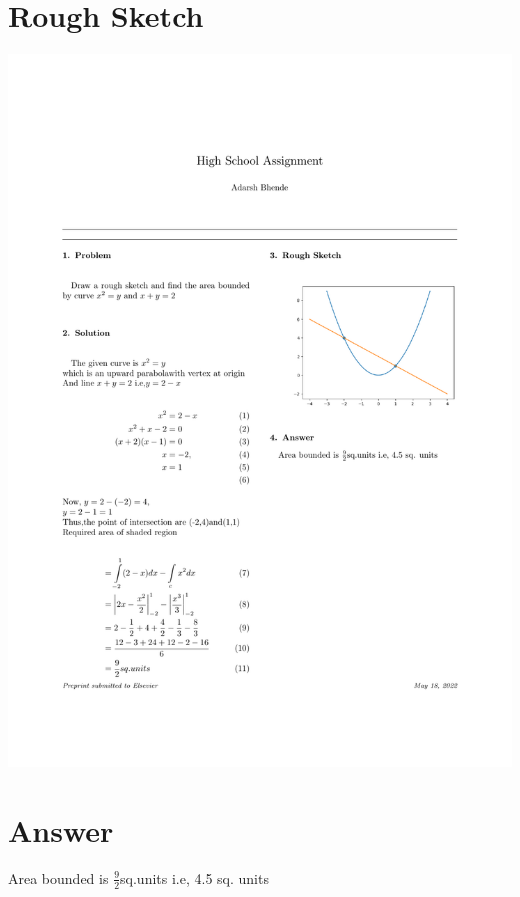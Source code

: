 \documentclass[twocolumn,3p]{elsarticle}
\begin{document}
\section{Rough Sketch}
\includegraphics[scale=.5]{main}
\section{Answer}
Area bounded is $\frac{9}{2}$sq.units i.e, 4.5 sq. units\\
\end{document}

